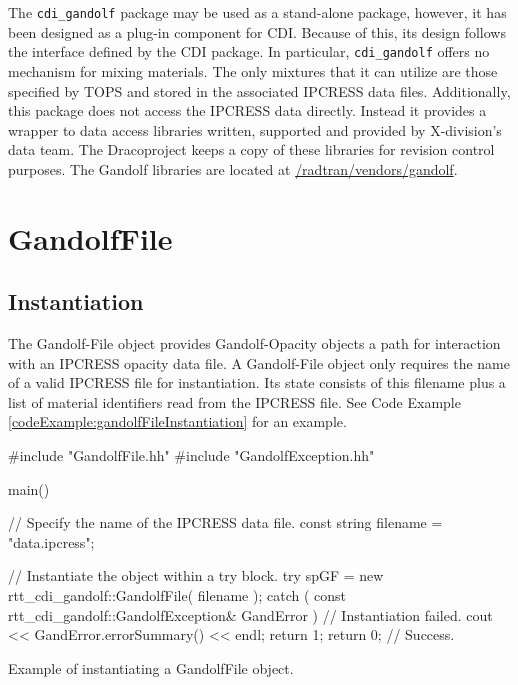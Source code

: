 \documentclass[11pt]{nmemo}
\newcommand{\draco}{{\normalfont\sffamily Draco}}
\newenvironment{codeExample}
{\footnotesize 
  \VerbatimEnvironment
  \begin{SaveVerbatim}{\mycode}}%
  {\end{SaveVerbatim}%
  \noindent%
  \parashade[.950]{sharpcorners}{\gdef\outlineboxwidth{.5}%
    \UseVerbatim{\mycode}}\normalsize}
\begin{document}
The \texttt{cdi\_gandolf} package may be used as a stand-alone
package, however, it has been designed as a plug-in component for CDI.
Because of this, its design follows the interface defined by the CDI
package.  In particular, \texttt{cdi\_gandolf} offers no mechanism for
mixing materials.  The only mixtures that it can utilize are those
specified by TOPS and stored in the associated IPCRESS data files.
Additionally, this package does not access the IPCRESS data directly.
Instead it provides a wrapper to data access libraries written,
supported and provided by X-division's data team.  The \draco project
keeps a copy of these libraries for revision control purposes.  The
Gandolf libraries are located at
\url{/radtran/vendors/gandolf}.


\section{GandolfFile}
\label{gandolffile}
\subsection{Instantiation}

The Gandolf-File object provides Gandolf-Opacity objects a path for
interaction with an IPCRESS opacity data file.  A Gandolf-File object
only requires the name of a valid IPCRESS file for instantiation.  Its
state consists of this filename plus a list of material identifiers
read from the IPCRESS file.  See Code Example
\ref{codeExample:gandolfFileInstantiation} for an example.

\begin{cxxSampleCode}
\begin{codeExample}
#include "GandolfFile.hh"
#include "GandolfException.hh"

main()
{
   // Specify the name of the IPCRESS data file.
   const string filename = "data.ipcress";

   // Instantiate the object within a try block.
   try
      {
         spGF = new rtt_cdi_gandolf::GandolfFile( filename );
      }
   catch ( const rtt_cdi_gandolf::GandolfException& GandError )
      {
         // Instantiation failed.
         cout << GandError.errorSummary() << endl;
         return 1;
      }
   return 0;  // Success.
}
\end{codeExample}
\caption{Example of instantiating a GandolfFile object.}
\label{codeExample:gandolfFileInstantiation}
\end{cxxSampleCode}
\end{document}
